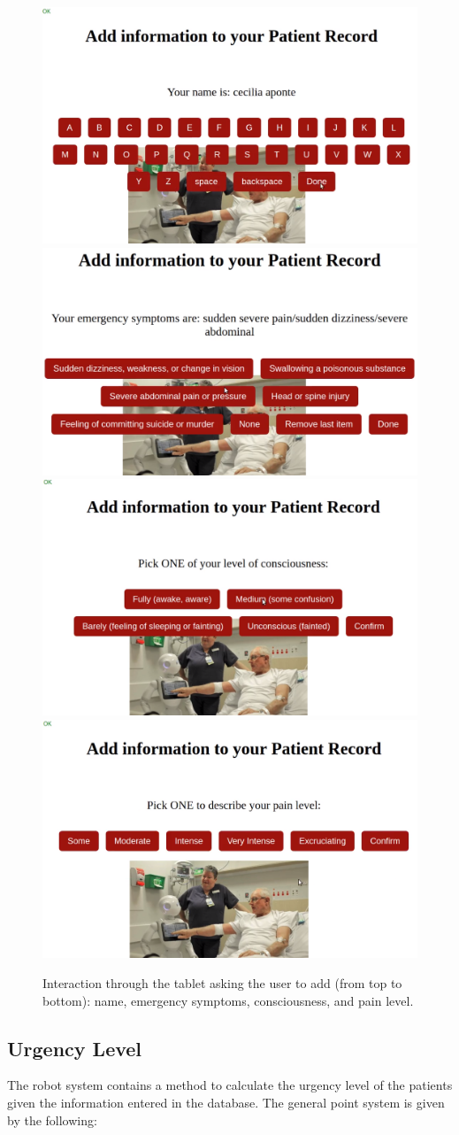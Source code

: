 \documentclass[letterpaper]{article}
\begin{document}
\begin{figure}
  \centering
  \includegraphics[width=.45\textwidth]{RecordAddName.png}\hfill
  \includegraphics[width=.45\textwidth]{RecordAddEmergencyMain.png}\hfill
  \includegraphics[width=.45\textwidth]{RecordAddConsciousness.png}\hfill
  \includegraphics[width=.45\textwidth]{RecordAddPainLevel.png} \bigskip 
   \caption{Interaction through the tablet asking the user to add (from top to bottom): name, emergency symptoms, consciousness, and pain level.} 
\end{figure}


\subsection{Urgency Level}

The robot system contains a method to calculate the urgency level of the patients given the information entered in the database. The general point system is given by the following:
\end{document}
